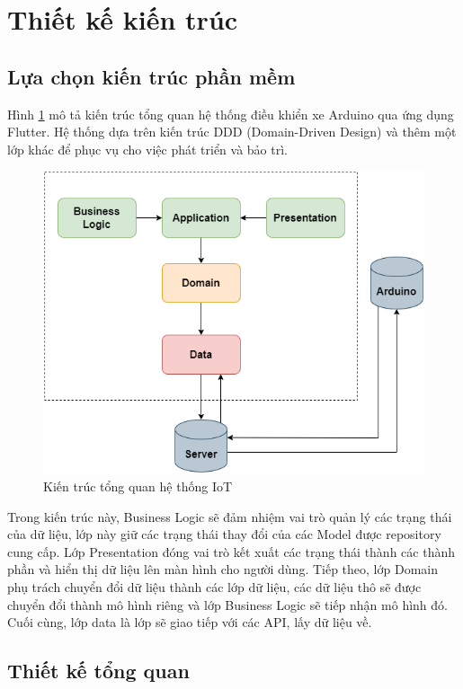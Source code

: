 \documentclass[../DoAn.tex]{subfiles}
\begin{document}
\section{Thiết kế kiến trúc}
\subsection{Lựa chọn kiến trúc phần mềm}

Hình \ref{fig:Fig1} mô tả kiến trúc tổng quan hệ thống điều khiển xe Arduino qua ứng dụng Flutter. Hệ thống dựa trên kiến trúc DDD (Domain-Driven Design) và thêm một lớp khác để phục vụ cho việc phát triển và bảo trì.

\begin{figure}[H]
    \centering
    \includegraphics[scale = 0.6]{Hinhve/uml_package.png}
    \caption{Kiến trúc tổng quan hệ thống IoT}
    \label{fig:Fig1}
\end{figure}

Trong kiến trúc này, Business Logic sẽ đảm nhiệm vai trò quản lý các trạng thái của dữ liệu, lớp này giữ các trạng thái thay đổi của các Model được repository cung cấp. Lớp Presentation đóng vai trò kết xuất các trạng thái thành các thành phần và hiển thị dữ liệu lên màn hình cho người dùng. Tiếp theo, lớp Domain phụ trách chuyển đổi dữ liệu thành các lớp dữ liệu, các dữ liệu thô sẽ được chuyển đổi thành mô hình riêng và lớp Business Logic sẽ tiếp nhận mô hình đó. Cuối cùng, lớp data là lớp sẽ giao tiếp với các API, lấy dữ liệu về.

\subsection{Thiết kế tổng quan}
\end{document}
